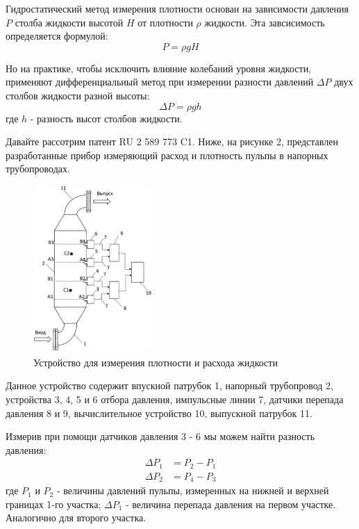 \documentclass[russian, utf8, 12pt]{eskdtext}
\begin{document}
Гидростатический метод измерения плотности основан на зависимости давления $P$ столба жидкости высотой $H$ от плотности $\rho$ жидкости. Эта завсисимость определяется формулой:
\begin{equation}
	P = \rho g H
\end{equation}

Но на практике, чтобы исключить влияние колебаний уровня жидкости, применяют дифференциальный метод при измерении разности давлений $\Delta P$ двух столбов жидкости разной высоты: 
\begin{equation}
	\Delta P = \rho g h 
\end{equation}
где $h$ - разность высот столбов жидкости. \par

Давайте рассотрим патент RU 2 589 773 C1. Ниже, на рисунке 2, представлен разработанные прибор измеряющий расход и плотность пульпы в напорных трубопроводах. 

\begin{figure}[h!]
	\centering
	\includegraphics[width = 0.4\textwidth] {HydrostaticDensityMeter.png}
	\caption{Устройство для измерения плотности и расхода жидкости}
\end{figure}

\newpage
Данное устройство содержит впускной патрубок 1, напорный трубопровод 2, устройства 3, 4, 5 и 6 отбора давления, импульсные линии 7, датчики перепада давления 8 и 9, вычислительное устройство 10, выпускной патрубок 11. \par

Измерив при помощи датчиков давления 3 - 6 мы можем найти разность давления:
\begin{align}
	\Delta P_1 & = P_2 - P_1 \\
	\Delta P_2 & = P_4 - P_3
\end{align}
где $P_1$ и $P_2$ - величины давлений пульпы, измеренных на нижней и верхней границах 1-го участка; $\Delta P_1$ - величина перепада давления на первом участке. Аналогично для второго участка. \par
\end{document}
